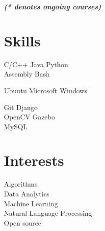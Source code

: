 \documentclass[a4paper]{deedy-resume} %
\begin{document}
\begin{minipage}[t]{0.33\textwidth}
  {\footnotesize \textit{\textbf{(* denotes ongoing courses) }}} \\

  \sectionspace

  \section{Skills}

  \runsubsection{}
  C/C++ \textbullet{} Java \textbullet{} Python \\
  \textbullet{} Assembly \textbullet{} Bash

  \sectionspace
  \sectionspace

  Ubuntu \textbullet{} Microsoft Windows

  \sectionspace
  \sectionspace

  Git \textbullet{} Django  \\
  \textbullet{} OpenCV \textbullet{} Gazebo \\
  \textbullet{} MySQL

  \sectionspace
  \sectionspace

  \section{Interests}
  Algorithms \\
  Data Analytics \\
  Machine Learning \\
  Natural Language Processing \\
  Open source \\
\end{minipage}
\hfill
\end{document}
